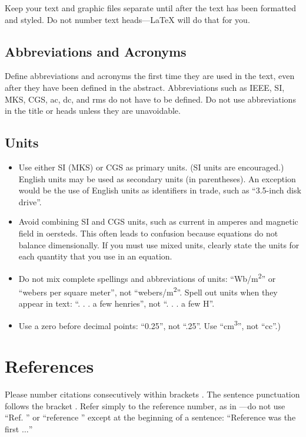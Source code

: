 \documentclass[conference]{IEEEtran}
\begin{document}
Keep your text and graphic files separate until after the text has been 
formatted and styled. Do not number text heads---{\LaTeX} will do that 
for you.

\subsection{Abbreviations and Acronyms}\label{AA}
Define abbreviations and acronyms the first time they are used in the text, 
even after they have been defined in the abstract. Abbreviations such as 
IEEE, SI, MKS, CGS, ac, dc, and rms do not have to be defined. Do not use 
abbreviations in the title or heads unless they are unavoidable.

\subsection{Units}
\begin{itemize}
\item Use either SI (MKS) or CGS as primary units. (SI units are encouraged.) English units may be used as secondary units (in parentheses). An exception would be the use of English units as identifiers in trade, such as ``3.5-inch disk drive''.
\item Avoid combining SI and CGS units, such as current in amperes and magnetic field in oersteds. This often leads to confusion because equations do not balance dimensionally. If you must use mixed units, clearly state the units for each quantity that you use in an equation.
\item Do not mix complete spellings and abbreviations of units: ``Wb/m\textsuperscript{2}'' or ``webers per square meter'', not ``webers/m\textsuperscript{2}''. Spell out units when they appear in text: ``. . . a few henries'', not ``. . . a few H''.
\item Use a zero before decimal points: ``0.25'', not ``.25''. Use ``cm\textsuperscript{3}'', not ``cc''.)
\end{itemize}



\section*{References}

Please number citations consecutively within brackets \cite{b1}. The 
sentence punctuation follows the bracket \cite{b2}. Refer simply to the reference 
number, as in \cite{b3}---do not use ``Ref. \cite{b3}'' or ``reference \cite{b3}'' except at 
the beginning of a sentence: ``Reference \cite{b3} was the first $\ldots$''
\end{document}

